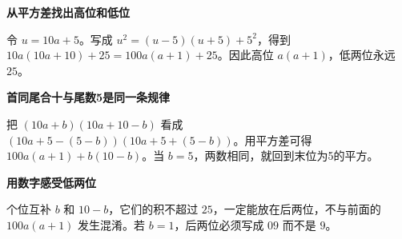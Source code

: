 \clearpage
\begin{explanationbox}
\textbf{\textcolor{CExplanation}{从平方差找出高位和低位}}
\par\medskip
\begin{center}

\end{center}
\medskip
令 $u=10a+5$。写成 $u^2=(u-5)(u+5)+5^2$，得到 $10a(10a+10)+25=100a(a+1)+25$。因此高位 $a(a+1)$，低两位永远 $25$。
\end{explanationbox}
\clearpage
\begin{explanationbox}
\textbf{\textcolor{CExplanation}{首同尾合十与尾数5是同一条规律}}
\par\medskip
\begin{center}

\end{center}
\medskip
把 $(10a+b)(10a+10-b)$ 看成 $(10a+5-(5-b))(10a+5+(5-b))$。用平方差可得 $100a(a+1)+b(10-b)$。当 $b=5$，两数相同，就回到末位为5的平方。
\end{explanationbox}
\clearpage
\begin{explanationbox}
\textbf{\textcolor{CExplanation}{用数字感受低两位}}
\par\medskip
\begin{center}

\end{center}
\medskip
个位互补 $b$ 和 $10-b$，它们的积不超过 $25$，一定能放在后两位，不与前面的 $100a(a+1)$ 发生混淆。若 $b=1$，后两位必须写成 $09$ 而不是 $9$。
\end{explanationbox}
